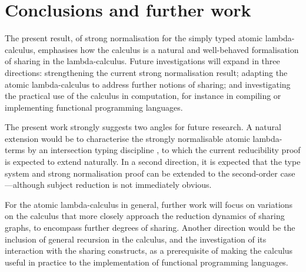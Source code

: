 \documentclass[orivec]{llncs}
\begin{document}
\section{Conclusions and further work}



The present result, of strong normalisation for the simply typed atomic lambda-calculus, emphasises how the calculus is a natural and well-behaved formalisation of sharing in the lambda-calculus.
%
Future investigations will expand in three directions: strengthening the current strong normalisation result; adapting the atomic lambda-calculus to address further notions of sharing; and investigating the practical use of the calculus in computation, for instance in compiling or implementing functional programming languages.



The present work strongly suggests two angles for future research.
%
A natural extension would be to characterise the strongly normalisable atomic lambda-terms by an intersection typing discipline \cite{Coppo-DezaniCiancaglini-1980,Pottinger-1980,Krivine-1993}, to which the current reducibility proof is expected to extend naturally.
%
In a second direction, it is expected that the type system and strong normalisation proof can be extended to the second-order case---although subject reduction is not immediately obvious. %


For the atomic lambda-calculus in general, further work will focus on variations on the calculus that more closely approach the reduction dynamics of sharing graphs, to encompass further degrees of sharing.
%
Another direction would be the inclusion of general recursion in the calculus, and the investigation of its interaction with the sharing constructs, as a prerequisite of making the calculus useful in practice to the implementation of functional programming languages.





\end{document}
